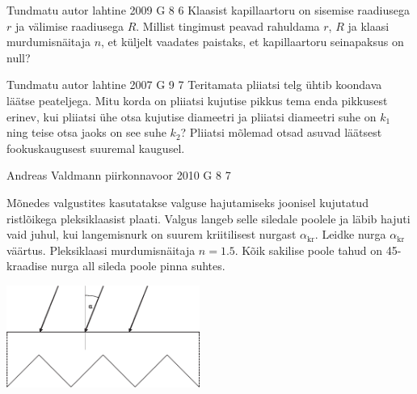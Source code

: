 \documentclass[11pt]{article}
\begin{document}
{%
{Tundmatu autor} %
{lahtine} %
{2009} %
{G 8} %
{6} %
{
\ifStatement
Klaasist kapillaartoru on sisemise raadiusega $r$ ja välimise raadiusega $R$. Millist tingimust peavad rahuldama $r$, $R$ ja klaasi murdumisnäitaja $n$, et küljelt vaadates paistaks, et kapillaartoru seinapaksus on null?
\fi
}

{Tundmatu autor} %
{lahtine} %
{2007} %
{G 9} %
{7} %
{
\ifStatement
Teritamata pliiatsi telg ühtib koondava läätse peateljega. Mitu korda on pliiatsi kujutise pikkus tema enda pikkusest erinev, kui pliiatsi ühe otsa kujutise diameetri ja pliiatsi diameetri suhe on $k_1$ ning teise otsa jaoks on see suhe $k_2$? Pliiatsi mõlemad otsad asuvad läätsest fookuskaugusest suuremal kaugusel.
\fi
}

{Andreas Valdmann} %
{piirkonnavoor} %
{2010} %
{G 8} %
{7} %
{
\ifStatement
Mõnedes valgustites kasutatakse valguse hajutamiseks joonisel kujutatud ristlõikega
pleksiklaasist plaati. Valgus langeb selle siledale poolele ja läbib hajuti vaid juhul, kui
langemisnurk on suurem kriitilisest nurgast $\alpha_\mathrm{kr}$. Leidke nurga $\alpha_\mathrm{kr}$ väärtus. Pleksiklaasi
murdumisnäitaja $n=\num{1,5}$. Kõik sakilise poole tahud on \num{45}-kraadise nurga all sileda poole pinna
suhtes.
\begin{center}
	\includegraphics[width=0.475\textwidth]{2010-v2g-08-hajuti.eps}
\end{center}
\fi
}

}
\end{document}
